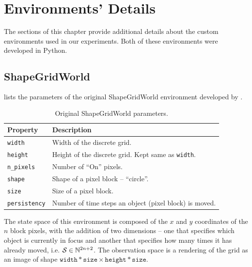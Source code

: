 \makeatletter
{}
\makeatother
{}

\chapter{Environments' Details}
\label{sec:environments-details}
The sections of this chapter provide additional details about the custom environments used in our experiments.
Both of these environments were developed in Python.

\section{ShapeGridWorld}
\label{sec:sgw-details}
 lists the parameters of the original ShapeGridWorld environment developed by \cite{rair}.
\begin{table}[H]
    \centering
    \begin{tabularx}{\textwidth}{C{3.9cm} L}
        \hline
        Property & Description\\
        \hline
        \texttt{width} & Width of the discrete grid.\\
        \texttt{height} & Height of the discrete grid. Kept same as \texttt{width}.\\
        \texttt{n\_pixels} & Number of ``On'' pixels.\\
        \texttt{shape} & Shape of a pixel block -- ``circle''.\\
        \texttt{size} & Size of a pixel block.\\
        \texttt{persistency} & Number of time steps an object (pixel block) is moved. \\
        \hline
    \end{tabularx}
    \caption{Original ShapeGridWorld parameters.}
    \label{tab:original-sgw-params}
\end{table}
The state space of this environment is composed of the \(x\) and \(y\) coordinates of the \(n\) block pixels, with the addition of two dimensions -- one that specifies which object is currently in focus and another that specifies how many times it has already moved, i.e. \(\mathcal{S} \in \mathbb{N}^{2 n + 2}\).
The observation space is a rendering of the grid as an image of shape \(\texttt{width} * \texttt{size} \times \texttt{height} * \texttt{size}\).

